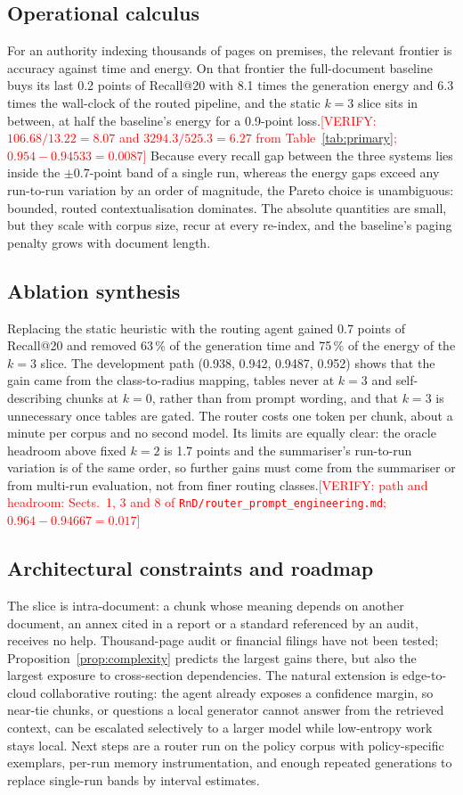 \documentclass[pdflatex,sn-mathphys-num]{sn-jnl}
\makeatletter
\newcommand{\todo}[1]{\textcolor{red}{#1}}
\newcommand{\verify}[1]{\todo{[VERIFY: #1]}}
\newcommand{\Rec}[1]{Recall@#1}
\theoremstyle{thmstyleone}%
\theoremstyle{thmstylethree}%
\makeatother
\begin{document}
\subsection{Operational calculus}
For an authority indexing thousands of pages on premises, the relevant frontier is accuracy against time and energy. On that frontier the full-document baseline buys its last 0.2 points of \Rec{20} with 8.1 times the generation energy and 6.3 times the wall-clock of the routed pipeline, and the static $k=3$ slice sits in between, at half the baseline's energy for a 0.9-point loss.\verify{$106.68/13.22=8.07$ and $3294.3/525.3=6.27$ from Table~\ref{tab:primary}; $0.954-0.94533=0.0087$} Because every recall gap between the three systems lies inside the $\pm0.7$-point band of a single run, whereas the energy gaps exceed any run-to-run variation by an order of magnitude, the Pareto choice is unambiguous: bounded, routed contextualisation dominates. The absolute quantities are small, but they scale with corpus size, recur at every re-index, and the baseline's paging penalty grows with document length.

\subsection{Ablation synthesis}
Replacing the static heuristic with the routing agent gained 0.7 points of \Rec{20} and removed 63\,\% of the generation time and 75\,\% of the energy of the $k=3$ slice. The development path (0.938, 0.942, 0.9487, 0.952) shows that the gain came from the class-to-radius mapping, tables never at $k=3$ and self-describing chunks at $k=0$, rather than from prompt wording, and that $k=3$ is unnecessary once tables are gated. The router costs one token per chunk, about a minute per corpus and no second model. Its limits are equally clear: the oracle headroom above fixed $k=2$ is 1.7 points and the summariser's run-to-run variation is of the same order, so further gains must come from the summariser or from multi-run evaluation, not from finer routing classes.\verify{path and headroom: Sects.~1, 3 and 8 of \texttt{RnD/router\_prompt\_engineering.md}; $0.964-0.94667=0.017$}

\subsection{Architectural constraints and roadmap}
The slice is intra-document: a chunk whose meaning depends on another document, an annex cited in a report or a standard referenced by an audit, receives no help. Thousand-page audit or financial filings have not been tested; Proposition~\ref{prop:complexity} predicts the largest gains there, but also the largest exposure to cross-section dependencies. The natural extension is edge-to-cloud collaborative routing: the agent already exposes a confidence margin, so near-tie chunks, or questions a local generator cannot answer from the retrieved context, can be escalated selectively to a larger model while low-entropy work stays local. Next steps are a router run on the policy corpus with policy-specific exemplars, per-run memory instrumentation, and enough repeated generations to replace single-run bands by interval estimates.
\end{document}
